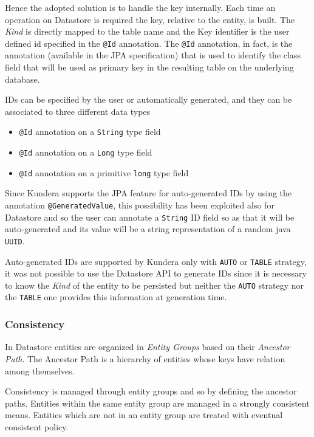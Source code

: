 \noindent Hence the adopted solution is to handle the key internally. Each time an operation on Datastore is required the key, relative to the entity, is built. The \textit{Kind} is directly mapped to the table name and the Key identifier is the user defined id specified in the \texttt{@Id} annotation.
The \texttt{@Id} annotation, in fact, is the annotation (available in the JPA specification) that is used to identify the class field that will be used as primary key in the resulting table on the underlying database.

\newparagraph IDs can be specified by the user or automatically generated, and they can be associated to three different data types
\begin{itemize}
\item \texttt{@Id} annotation on a \texttt{String} type field
\item \texttt{@Id} annotation on a \texttt{Long} type field
\item \texttt{@Id} annotation on a primitive \texttt{long} type field
\end{itemize}

\noindent Since Kundera supports the JPA feature for auto-generated IDs by using the annotation \texttt{@GeneratedValue}, this possibility has been exploited also for Datastore and so the user can annotate a \texttt{String} ID field so as that it will be auto-generated and its value will be a string representation of a random java \texttt{UUID}.

\noindent Auto-generated IDs are supported by Kundera only with \texttt{AUTO} or \texttt{TABLE} strategy, it was not possible to use the Datastore API to generate IDs since it is necessary to know the \textit{Kind} of the entity to be persisted but neither the \texttt{AUTO} strategy nor the \texttt{TABLE} one provides this information at generation time.

\subsubsection{Consistency}
In Datastore entities are organized in \textit{Entity Groups} based on their \textit{Ancestor Path}. The Ancestor Path is a hierarchy of entities whose keys have relation among themselves.

\noindent Consistency is managed through entity groups and so by defining the ancestor paths. Entities within the same entity group are managed in a strongly consistent means. Entities which are not in an entity group are treated with eventual consistent policy.

